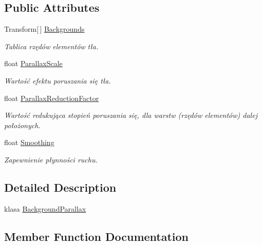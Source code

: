 \subsection*{Public Attributes}
\begin{DoxyCompactItemize}
\item 
Transform\mbox{[}$\,$\mbox{]} \hyperlink{class_background_parallax_a626641e92b9bedfbd0f5aaf2938875b3}{Backgrounds}
\begin{DoxyCompactList}\small\item\em Tablica rzędów elementów tła. \end{DoxyCompactList}\item 
float \hyperlink{class_background_parallax_a078a366dfc612de0f0848b9be330f055}{Parallax\+Scale}
\begin{DoxyCompactList}\small\item\em Wartość efektu poruszania się tła. \end{DoxyCompactList}\item 
float \hyperlink{class_background_parallax_aad6f6a27f24a5d911991227f8abe1a71}{Parallax\+Reduction\+Factor}
\begin{DoxyCompactList}\small\item\em Wartość redukująca stopień poruszania się, dla warstw (rzędów elementów) dalej położonych. \end{DoxyCompactList}\item 
float \hyperlink{class_background_parallax_ad9e09d728695d0c26f103ee614b67000}{Smoothing}
\begin{DoxyCompactList}\small\item\em Zapewnienie płynności ruchu. \end{DoxyCompactList}\end{DoxyCompactItemize}


\subsection{Detailed Description}
klasa \hyperlink{class_background_parallax}{Background\+Parallax} 



\subsection{Member Function Documentation}
\hypertarget{class_background_parallax_abb5fc2464be1a1bba55238be509a2082}{}
